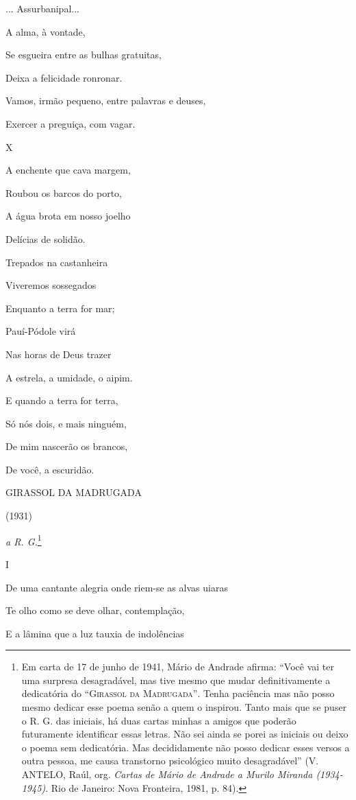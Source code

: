 ... Assurbanipal...

A alma, à vontade,

Se esgueira entre as bulhas gratuitas,

Deixa a felicidade ronronar.

Vamos, irmão pequeno, entre palavras e deuses,

Exercer a preguiça, com vagar.

X

A enchente que cava margem,

Roubou os barcos do porto,

A água brota em nosso joelho

Delícias de solidão.

Trepados na castanheira

Viveremos sossegados

Enquanto a terra for mar;

Pauí-Pódole virá

Nas horas de Deus trazer

A estrela, a umidade, o aipim.

E quando a terra for terra,

Só nós dois, e mais ninguém,

De mim nascerão os brancos,

De você, a escuridão.

\textsc{GIRASSOL DA MADRUGADA}

(1931)

\emph{a R. G.}\footnote{Em carta de 17 de junho de 1941, Mário de
  Andrade afirma: ``Você vai ter uma surpresa desagradável, mas tive
  mesmo que mudar definitivamente a dedicatória do ``\textsc{Girassol da
  Madrugada''}. Tenha paciência mas não posso mesmo dedicar esse poema
  senão a quem o inspirou. Tanto mais que se puser o R. G. das iniciais,
  há duas cartas minhas a amigos que poderão futuramente identificar
  essas letras. Não sei ainda se porei as iniciais ou deixo o poema sem
  dedicatória. Mas decididamente não posso dedicar esses versos a outra
  pessoa, me causa transtorno psicológico muito desagradável'' (V.
  ANTELO, Raúl, org. \emph{Cartas de Mário de Andrade a Murilo Miranda
  (1934-1945)}. Rio de Janeiro: Nova Fronteira, 1981, p. 84).}

I

De uma cantante alegria onde riem-se as alvas uiaras

Te olho como se deve olhar, contemplação,

E a lâmina que a luz tauxia de indolências

